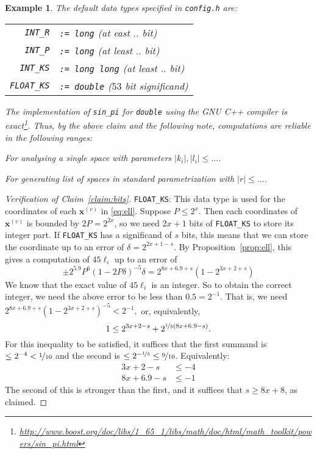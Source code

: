 \documentclass{article}
\newtheorem{eg}[thm]{Example}
\newcommand{\abs}[1]{\left|#1\right|}
\renewcommand{\vec}[1]{\mathbf{#1}}
\begin{document}
\begin{eg}
  The default data types specified in \verb+config.h+ are:
  \begin{center}
    \begin{tabular}{rp{20em}}
      \verb+INT_R+ & \texttt{:= long} (at east $..$ bit) \\
      \verb+INT_P+ & \texttt{:= long} (at least $..$ bit) \\
      \verb+INT_KS+ & \texttt{:= long long} (at least $..$ bit) \\
      \verb+FLOAT_KS+ & \texttt{:= double} ($53$ bit significand)
    \end{tabular}
  \end{center}
  The implementation of \verb+sin_pi+ for \texttt{double} using the GNU C++ compiler is exact\footnote{%
    \url{http://www.boost.org/doc/libs/1_65_1/libs/math/doc/html/math_toolkit/powers/sin_pi.html}}.
  Thus, by the above claim and the following note, computations are reliable in the following ranges:
  \begin{compactitem}
  \item For analysing a single space with parameters \(\abs{k_i}, \abs{l_i} \leq ...\).

  \item  For generating list of spaces in standard parametrization with \(\abs{r} \leq ...\).    
  \end{compactitem}
\end{eg}

\begin{proof}[Verification of Claim~\ref{claim:bits}]
  \verb+FLOAT_KS+:
  This data type is used for the coordinates of each \(\vec x^{(v)}\) in \eqref{eq:ell}.
  Suppose \(P\leq 2^x\). Then each coordinates of \(\vec x^{(v)}\) is bounded by \(2P = 2^{2x}\), so we need \(2x+1\) bits of \verb+FLOAT_KS+ to store its integer part. If \verb+FLOAT_KS+ has a significand of \(s\) bits, this means that we can store the coordinate up to an error of \(\delta = 2^{2x+1-s}\). By Proposition~\ref{prop:ell}, this gives a computation of \(45\ell_i\) up to an error of
  \[
    \pm 2^{5.9}P^6(1-2P\delta)^{-5}\delta = 2^{8x + 6.9 + s}(1-2^{3x + 2 + s})
  \]
  We know that the exact value of \(45\ell_i\) is an integer.  So to obtain the correct integer, we need the above error to be less than \(0.5 = 2^{-1}\).  That is, we need 
  \(
    2^{8x + 6.9 + s}(1-2^{3x + 2 + s})^{-5} < 2^{-1},
  \)
  or, equivalently,
  \[
    1 \leq 2^{3x + 2 - s} + 2^{\nicefrac{1}{5}(8x + 6.9 - s)}.
  \]
  For this inequality to be satisfied, it suffices that the first summand is \(\leq 2^{-4} < \nicefrac{1}{10}\) and the second is \(\leq 2^{-\nicefrac{1}{5}} \leq \nicefrac{9}{10}\).  Equivalently:
  \begin{align*}
    3x + 2 - s &\leq -4\\
    8x + 6.9 - s &\leq -1
  \end{align*}
  The second of this is stronger than the first, and it suffices that \(s\geq 8x + 8\), as claimed.
\end{proof}
\end{document}
